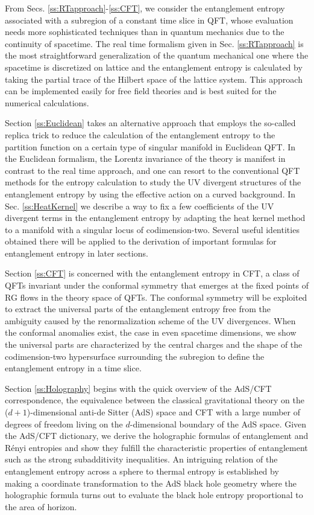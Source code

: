 From Secs. \ref{ss:RTapproach}-\ref{ss:CFT}, we consider the entanglement entropy associated with a subregion of a constant time slice in QFT, whose evaluation needs more sophisticated techniques than in quantum mechanics due to the continuity of spacetime.
The real time formalism given in Sec. \ref{ss:RTapproach} is the most straightforward generalization of the quantum mechanical one where the spacetime is discretized on lattice and the entanglement entropy is calculated by taking the partial trace of the Hilbert space of the lattice system.
This approach can be implemented easily for free field theories and is best suited for the numerical calculations.

Section \ref{ss:Euclidean} takes an alternative approach that employs the so-called replica trick to reduce the calculation of the entanglement entropy to the partition function on a certain type of singular manifold in Euclidean QFT.
In the Euclidean formalism, the Lorentz invariance of the theory is manifest in contrast to the real time approach, and one can resort to the conventional QFT methods for the entropy calculation to study the UV divergent structures of the entanglement entropy by using the effective action on a curved background.
In Sec. \ref{ss:HeatKernel} we describe a way to fix a few coefficients of the UV divergent terms in the entanglement entropy by adapting the heat kernel method to a manifold with a singular locus of codimension-two.
Several useful identities obtained there will be applied to the derivation of important formulas for entanglement entropy in later sections.

Section \ref{ss:CFT} is concerned with the entanglement entropy in CFT, a class of QFTs invariant under the conformal symmetry that emerges at the fixed points of RG flows in the theory space of QFTs.
The conformal symmetry will be exploited to extract the universal parts of the entanglement entropy free from the ambiguity caused by the renormalization scheme of the UV divergences.
When the conformal anomalies exist, the case in even spacetime dimensions, we show the universal parts are characterized by the central charges and the shape of the codimension-two hypersurface surrounding the subregion to define the entanglement entropy in a time slice.


Section \ref{ss:Holography} begins with the quick overview of the AdS/CFT correspondence, the equivalence between the classical gravitational theory on the ($d+1$)-dimensional anti-de Sitter (AdS) space and CFT with a large number of degrees of freedom living on the $d$-dimensional boundary of the AdS space.
Given the AdS/CFT dictionary, we derive the holographic formulas of entanglement and R{\'e}nyi entropies and show they fulfill the characteristic properties of entanglement such as the strong subadditivity inequalities.
An intriguing relation of the entanglement entropy across a sphere to thermal entropy is established by making a coordinate transformation to the AdS black hole geometry where the holographic formula turns out to evaluate the black hole entropy proportional to the area of horizon.


